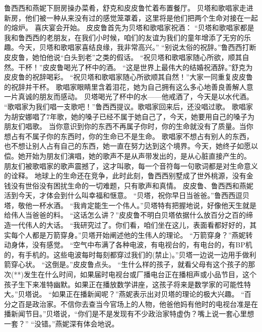 \documentclass[a4paper,12pt,UTF8,twoside]{ctexbook}
\begin{document}
        鲁西西和燕妮下厨房操办菜肴，舒克和皮皮鲁忙着布置餐厅。  
        贝塔和歌唱家走进新房，他们被一种从来没有过的感觉笼罩着，这里将是他们把两个生命对接在一起的熔炉。  
        喜庆宴会开始。  
        皮皮鲁首先为贝塔和歌唱家祝酒：  
        “贝塔和歌唱家都是我和鲁西西的老朋友，在我们小时候，咱们的友谊为我们的童年增添了无穷的乐趣。今天，贝塔和歌唱家喜结良缘，我非常高兴。”  
        “别说太俗的祝辞。”鲁西西打断皮皮鲁，她怕他说“白头到老”之类的假话。  
        “祝贝塔和歌唱家随心所欲，顺其自然。干杯！”皮皮鲁喝光了杯中的酒。  
        “这是世界上最伟大的结婚祝酒辞。”舒克为皮皮鲁的祝辞喝彩。        
        “祝贝塔和歌唱家随心所欲顺其自然！”大家一同重复皮皮鲁的祝辞并干杯。  
        歌唱家眼睛里含着泪花，她为自己拥有这么多心地善良善解人意一片真诚的朋友而感动。  
        贝塔喝光了杯中的水——他戒酒了，今天是以水代酒。  
        “歌唱家为我们唱一支歌吧！”鲁西西提议。歌唱家回来后，还没唱过歌。  
        歌唱家为胡安娜唱了7年歌，她的嗓子已经不属于她自己了，今天，她要用自己的嗓子为朋友们唱歌。  
        当你意识到你的东西不再属子你时，你的生命就没有了质量。当你想占有不属子你的东西时，你的生命已不是生命。  
        歌唱家不想占有别人的东西，也不想让别人占有自己的东西，她一直在努力达到这个境界。今天，她终子如愿以偿。她开始为朋友们演唱，她的歌声不是从声带发出的，是从心脏直接产生的。  
        朋友们被歌唱家的歌声震撼了，这才叫歌，每一个音符每一句歌词都是对生命意义的诠释。  
        地球上的生命还在竞争，此时此刻，鲁西西别墅成了世外桃源，没有金钱没有世俗没有困扰生命的一切难题，只有歌声和真情。  
        皮皮鲁、鲁西西和燕妮活到今天，才体会到什么叫幸福和惬意。  
        “贝塔，祝你早日当爸爸。”鲁西西逗贝塔，敬他一杯水酒。  
        “我肯定能生一个伟人。”贝塔特有把握地说，好像他天生就是给伟人当爸爸的料。  
        “这话怎么讲？”皮皮鲁不明白贝塔依据什么放百分之百的缔造一代伟人的大话。  
        “我研究过了。你们看，咱们坐在这儿，表面看都好好的，其实每个人都是万箭穿身。”贝塔开始阐述他的生伟人的理论。  
        “万箭穿身？”燕妮转动身体，没有感觉。  
        “空气中布满了各种电波，有电视台的，有电台的，有BP机的，有手机的。这些电波每时每刻都穿过我们的(禁止)。”贝塔一边说一边用手做利箭穿心状。  
        “这倒是。”皮皮鲁点头。  
        “生什么样的孩子，就看父母有这个孩子的那次(**)发生在什么时间，如果届时电视台或厂播电台正在播相声或小品节目，这个孩子生下来准特幽默。如果正在播放数学讲座，这孩子将来是数学家的可能性特大。”贝塔说。  
        “如果正在播新闻呢？”燕妮表示出对贝塔的理论的极大兴趣。  
        “百分之百是政治家。不信你去查当今官场上的人物，他爸他妈有他时的电视台准是在播新闻节目。”贝塔说，“你们是不是发现有不少政治家特虚伪？嘴上说一套心里想一套？”  
        “没错。”燕妮深有体会地说。  
\end{document}
